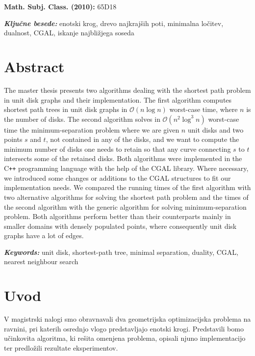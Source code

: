 \documentclass[a4paper, 12pt]{book}
\newcommand{\OO}{\ensuremath{\mathcal{O}}} %
\newcommand{\clearemptydoublepage}{\newpage{\pagestyle{empty}\cleardoublepage}}
\begin{document}
\begin{flushleft}
\textbf{Math. Subj. Class. (2010): } 65D18

\textbf{\textit{Ključne besede: }}enotski krog, drevo najkrajših poti, minimalna ločitev, dualnost, CGAL, iskanje najbližjega soseda
\end{flushleft}

\chapter*{Abstract}
The master thesis presents two algorithms dealing with the shortest path problem in unit disk graphs and their implementation. The first algorithm computes shortest path trees in unit disk graphs in $\OO(n\log n)$ worst-case time, where $n$ is the number of disks. The second algorithm solves in $\OO(n^2\log^3n)$ worst-case time the minimum-separation problem where we are given $n$ unit disks and two points $s$ and $t$, not contained in any of the disks, and we want to compute the minimum number of disks one needs to retain so that any curve connecting $s$ to $t$ intersects some of the retained disks. Both algorithms were implemented in the C\texttt{+}\texttt{+} programming language with the help of the CGAL library. Where necessary, we introduced some changes or additions to the CGAL structures to fit our implementation needs. We compared the running times of the first algorithm with two alternative algorithms for solving the shortest path problem and the times of the second algorithm with the generic algorithm for solving minimum-separation problem. Both algorithms perform better than their counterparts mainly in smaller domains with densely populated points, where consequently unit disk graphs have a lot of edges.
\bigbreak

\begin{flushleft}
\textbf{\textit{Keywords: }}unit disk, shortest-path tree, minimal separation, duality, CGAL, nearest neighbour search
\end{flushleft}


\clearemptydoublepage

\mainmatter
\setcounter{page}{1}
\pagestyle{fancy}

\chapter{Uvod}
V magistrski nalogi smo obravnavali dva geometrijska optimizacijska problema na ravnini, pri katerih osrednjo vlogo predstavljajo enotski krogi. Predstavili bomo učinkovita algoritma, ki rešita omenjena problema, opisali njuno implementacijo ter predložili rezultate eksperimentov.
\end{document}
